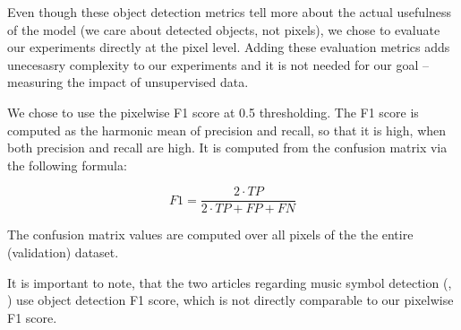 Even though these object detection metrics tell more about the actual usefulness of the model (we care about detected objects, not pixels), we chose to evaluate our experiments directly at the pixel level. Adding these evaluation metrics adds unecesasry complexity to our experiments and it is not needed for our goal -- measuring the impact of unsupervised data.

We chose to use the pixelwise F1 score at 0.5 thresholding. The F1 score is computed as the harmonic mean of precision and recall, so that it is high, when both precision and recall are high. It is computed from the confusion matrix via the following formula:

$$
    F1 = \frac{2 \cdot TP}{2 \cdot TP + FP + FN}
$$

The confusion matrix values are computed over all pixels of the the entire (validation) dataset.

It is important to note, that the two articles regarding music symbol detection (\cite{HajicEtAl}, \cite{DorferEtAl}) use object detection F1 score, which is not directly comparable to our pixelwise F1 score.
